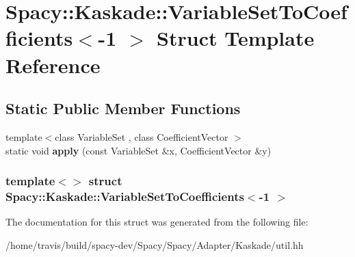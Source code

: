 \hypertarget{structSpacy_1_1Kaskade_1_1VariableSetToCoefficients_3-1_01_4}{\section{\-Spacy\-:\-:\-Kaskade\-:\-:\-Variable\-Set\-To\-Coefficients$<$-\/1 $>$ \-Struct \-Template \-Reference}
\label{structSpacy_1_1Kaskade_1_1VariableSetToCoefficients_3-1_01_4}
}
\subsection*{\-Static \-Public \-Member \-Functions}
\begin{DoxyCompactItemize}
\item 
\hypertarget{structSpacy_1_1Kaskade_1_1VariableSetToCoefficients_3-1_01_4_a8691dbba4c04d6de55d1192ca85ad808}{{\footnotesize template$<$class Variable\-Set , class Coefficient\-Vector $>$ }\\static void {\bfseries apply} (const \-Variable\-Set \&x, \-Coefficient\-Vector \&y)}\label{structSpacy_1_1Kaskade_1_1VariableSetToCoefficients_3-1_01_4_a8691dbba4c04d6de55d1192ca85ad808}

\end{DoxyCompactItemize}
\subsubsection*{template$<$$>$ struct Spacy\-::\-Kaskade\-::\-Variable\-Set\-To\-Coefficients$<$-\/1 $>$}



\-The documentation for this struct was generated from the following file\-:\begin{DoxyCompactItemize}
\item 
/home/travis/build/spacy-\/dev/\-Spacy/\-Spacy/\-Adapter/\-Kaskade/util.\-hh\end{DoxyCompactItemize}

